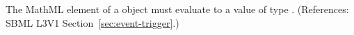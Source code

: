 The MathML  element of a \Trigger object must evaluate to a
value of type .  (References: SBML L3V1
Section~\ref{sec:event-trigger}.)

